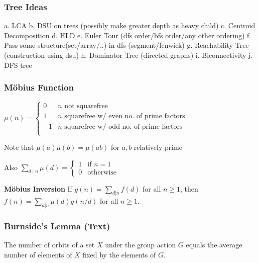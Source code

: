 \documentclass[12pt]{extarticle}
\begin{document}
\begin{multicols*}{2}
			\subsubsection*{Tree Ideas}
			a. LCA \hspace{0.5cm}
			b. DSU on trees (possibly make greater depth as heavy child)\hspace{0.5cm}
			c. Centroid Decomposition\hspace{0.5cm}
			d. HLD\hspace{0.5cm}
			e. Euler Tour (dfs order/bfs order/any other ordering)\hspace{0.5cm}
			f. Pass some structure(set/array/..) in dfs (segment/fenwick)\hspace{0.5cm}
			g. Reachability Tree (construction using dsu) \hspace{0.5cm}
			h. Dominator Tree (directed graphs) \hspace{0.5cm}
			i. Biconnectivity \hspace{0.5cm}
			j. DFS tree \hspace{0.5cm}
			
						
			\subsubsection*{M\"obius Function} %
			$\mu(n) = \begin{cases}
			0 & \text{$n$ not squarefree} \\
			1 & \text{$n$ squarefree w/ even no. of prime factors} \\
			-1 & \text{$n$ squarefree w/ odd no. of prime factors} \\
			\end{cases}$
			\par
			Note that $\mu(a) \mu(b) = \mu(ab)$ for $a, b$ relatively prime
			\par
			Also $\sum_{d \mid n} \mu(d) = \begin{cases} 1 & \text{if $n = 1$} \\
			0 & \text{otherwise} \end{cases}$
			
			\textbf{M\"obius Inversion}
			If $g(n) = \sum_{d|n} f(d)$ for all $n \ge 1$, then
			$f(n) = \sum_{d|n} \mu(d)g(n/d)$ for all $n \ge 1$.
			
			\par\vskip 7pt
			\subsubsection*{Burnside's Lemma (Text)} %
			The number of orbits of a set $X$ under the group action $G$ equals the average
			number of elements of $X$ fixed by the elements of $G$.
			

\end{multicols*}
\end{document}

